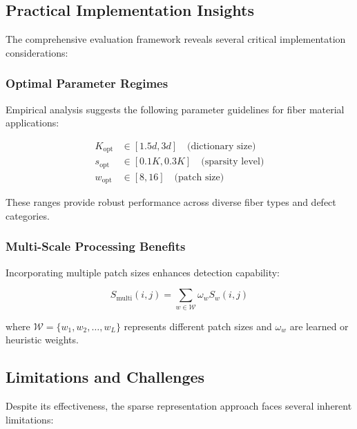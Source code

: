 \documentclass[12pt]{article}
\begin{document}
\subsection{Practical Implementation Insights}
\label{subsec:practical_insights}

The comprehensive evaluation framework reveals several critical implementation considerations:

\subsubsection{Optimal Parameter Regimes}
\label{subsubsec:optimal_parameters}

Empirical analysis suggests the following parameter guidelines for fiber material applications:

\begin{align}
    K_{\text{opt}} & \in [1.5d, 3d] \quad \text{(dictionary size)} \label{eq:k_opt}  \\
    s_{\text{opt}} & \in [0.1K, 0.3K] \quad \text{(sparsity level)} \label{eq:s_opt} \\
    w_{\text{opt}} & \in [8, 16] \quad \text{(patch size)} \label{eq:w_opt}
\end{align}

These ranges provide robust performance across diverse fiber types and defect categories.

\subsubsection{Multi-Scale Processing Benefits}
\label{subsubsec:multiscale_benefits}

Incorporating multiple patch sizes enhances detection capability:

\begin{equation}
    \label{eq:multiscale_score}
    S_{\text{multi}}(i,j) = \sum_{w \in \mathcal{W}} \omega_w S_w(i,j)
\end{equation}

where $\mathcal{W} = \{w_1, w_2, \ldots, w_L\}$ represents different patch sizes and $\omega_w$ are learned or heuristic weights.

\subsection{Limitations and Challenges}
\label{subsec:limitations}

Despite its effectiveness, the sparse representation approach faces several inherent limitations:
\end{document}
